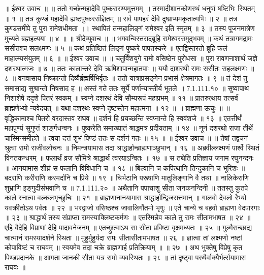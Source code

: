 ॥ ईश्वर उवाच ॥ ॥
ततो गच्छेन्महादेवि पुष्करारण्यमुत्तमम् ॥
तस्मादीशानकोणस्थं धनुषां षष्टिभिः स्थितम् ॥ १ ॥
तत्र कुण्डं महादेवि ह्यष्टपुष्करसंज्ञितम् ॥
सर्व पापहरं देवि दुष्प्राप्यमकृतात्मभिः ॥ २ ॥
तत्र कुण्डसमीपे तु पुरा रामेशधीमता ।।
स्थापितं तन्महालिङ्गं रामेश्वर इति स्मृतम् ॥ ३ ॥
तस्य पूजनमात्रेण मुच्यते ब्रह्महत्यया ॥ ४ ॥
॥ श्रीदेव्युवाच ॥ ॥
भगवन्विस्तराद्ब्रूहि रामेश्वरसमुद्भवम् ॥
कथं तत्रागमद्रामः ससीतश्च सलक्ष्मणः ॥ ५ ॥
कथं प्रतिष्ठितं लिङ्गं पुष्करे पापतस्करे ॥
एतद्विस्तरतो ब्रूहि फलं माहात्म्यसंयुतम् ॥ ६ ॥
॥ ईश्वर उवाच ॥ ॥
चतुर्विंशयुगे रामो वसिष्ठेन पुरोधसा ॥
पुरा रावणनाशार्थं जज्ञे दशरथात्मजः ॥ ७ ॥
ततः कालान्तरे देवि ऋषिशापान्महातपाः ॥
ययौ दाशरथी रामः ससीतः सहलक्ष्मणः ॥ ८ ॥
वनवासाय निष्क्रान्तो दिव्यैर्ब्रह्मर्षिभिर्वृतः ॥
ततो यात्राप्रसङ्गेन प्रभासं क्षेत्रमागतः ॥ ९ ॥
तं देशं तु समासाद्य सुश्रान्तो निषसाद ह ॥
अस्तं गते ततः सूर्ये पर्णान्यास्तीर्य भूतले ॥ 7.1.111.१० ॥
सुष्वापाथ निशाशेषे ददृशे पितरं स्वकम् ॥
स्वप्ने दशरथं देवि सौम्यरूपं महाप्रभम् ॥ ११ ॥
प्रातरुत्थाय तत्सर्वं ब्राह्मणेभ्यो न्यवेदयत् ॥
यथा दशरथः स्वप्ने दृष्टस्तेन महात्मना ॥ १२ ॥
॥ ब्राह्मणा ऊचुः ॥ ॥
वृद्धिकामाश्च पितरो वरदास्तव राघव ॥
दर्शनं हि प्रयच्छन्ति स्वप्नान्ते हि स्ववंशजे ॥ १३ ॥
एतत्तीर्थं महापुण्यं सुगुप्तं शार्ङ्गधन्वनः ॥
पुष्करेति समाख्यातं श्राद्धमत्र प्रदीयताम् ॥ १४ ॥
नूनं दशरथो राजा तीर्थे चास्मिन्समीहते ॥
त्वया दत्तं शुभं पिण्डं ततः स दर्शनं गतः ॥ १५ ॥
॥ ईश्वर उवाच ॥ ॥
तेषां तद्वचनं श्रुत्वा रामो राजीवलोचनः ॥
निमन्त्रयामास तदा श्राद्धार्हान्ब्राह्मणाञ्छुभान् ॥ १६ ॥
अब्रवील्लक्ष्मणं पार्श्वे स्थितं विनतकन्धरम् ॥
फलार्थं व्रज सौमित्रे श्राद्धार्थं त्वरयाऽन्वितः ॥ १७ ॥
स तथेति प्रतिज्ञाय जगाम रघुनन्दनः ॥
आनयामास शीघ्रं स फलानि विविधानि च ॥ १८ ॥
बिल्वानि च कपित्थानि तिन्दुकानि च भूरिशः ॥
बदराणि करीराणि करमर्दानि च प्रिये ॥ १९ ॥
चिर्भटानि परूषाणि मातुलिङ्गानि वै तथा ॥
नालिकेराणि शुभ्राणि इङ्गुदीसंभवानि च ॥ 7.1.111.२० ॥
अथैतानि पपाचाशु सीता जनकनन्दिनी ॥
ततस्तु कुतपे काले स्नात्वा वल्कलभृच्छुचिः ॥ २१ ॥
ब्राह्मणानानयामास श्राद्धार्हान्द्विजसत्तमान् ॥
गालवो देवलो रैभ्यो यवक्रीतोऽथ पर्वतः ॥ २२ ॥
भरद्वाजो वसिष्ठश्च जावालिर्गौतमो भृगुः ॥
एते चान्ये च बहवो ब्राह्मणा वेदपारगाः ॥ २३ ॥
श्राद्धार्थं तस्य संप्राप्ता रामस्याक्लिष्टकर्मणः ॥
एतस्मिन्नेव काले तु रामः सीतामभाषत ॥ २४ ॥
एहि वैदेहि विप्राणां देहि पादावनेजनम् ॥
एतच्छ्रुत्वाऽथ सा सीता प्रविष्टा वृक्षमध्यतः ॥ २५ ॥
गुल्मैराच्छाद्य चात्मानं रामस्यादर्शने स्थिता ॥
मुहुर्मुहुर्यदा रामः सीतासीतामभाषत ॥ २६ ॥
ज्ञात्वा तां लक्ष्मणो नष्टां कोपाविष्टं च राघवम् ॥
स्वयमेव तदा चक्रे ब्राह्मणार्ह प्रतिक्रियाम् ॥ ॥ २७ ॥
अथ भुक्तेषु विप्रेषु कृत पिण्डप्रदानके ॥
आगता जानकी सीता यत्र रामो व्यवस्थितः ॥ २८ ॥
तां दृष्ट्वा परुषैर्वाक्यैर्भर्त्सयामास राघवः ॥
